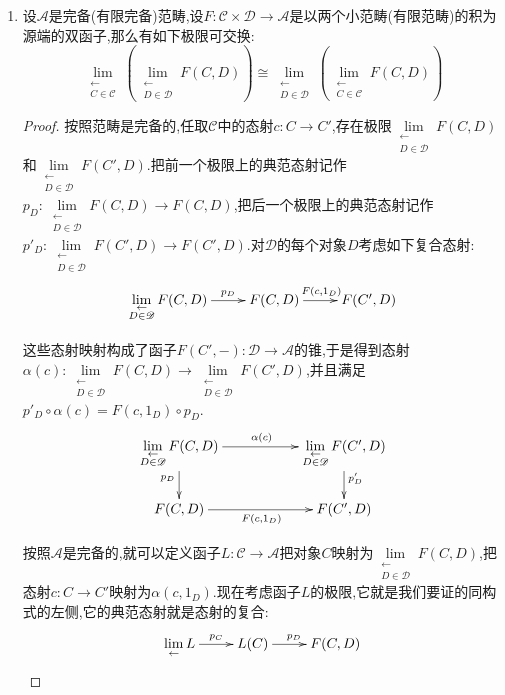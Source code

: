 \begin{enumerate}
	\item 设$\mathscr{A}$是完备(有限完备)范畴,设$F:\mathscr{C}\times\mathscr{D}\to\mathscr{A}$是以两个小范畴(有限范畴)的积为源端的双函子,那么有如下极限可交换:
	$$\lim\limits_{\substack{\leftarrow\\C\in\mathscr{C}}}\left(\lim\limits_{\substack{\leftarrow\\D\in\mathscr{D}}}F(C,D)\right)\cong\lim\limits_{\substack{\leftarrow\\D\in\mathscr{D}}}\left(\lim\limits_{\substack{\leftarrow\\C\in\mathscr{C}}}F(C,D)\right)$$
	\begin{proof}
		
		按照范畴是完备的,任取$\mathscr{C}$中的态射$c:C\to C'$,存在极限$\lim\limits_{\substack{\leftarrow\\D\in\mathscr{D}}}F(C,D)$和$\lim\limits_{\substack{\leftarrow\\D\in\mathscr{D}}}F(C',D)$.把前一个极限上的典范态射记作$p_D:\lim\limits_{\substack{\leftarrow\\D\in\mathscr{D}}}F(C,D)\to F(C,D)$,把后一个极限上的典范态射记作$p'_D:\lim\limits_{\substack{\leftarrow\\D\in\mathscr{D}}}F(C',D)\to F(C',D)$.对$\mathscr{D}$的每个对象$D$考虑如下复合态射:
		$$\xymatrix{\lim\limits_{\substack{\leftarrow\\D\in\mathscr{D}}}F(C,D)\ar[r]^{\quad p_D}&F(C,D)\ar[r]^{F(c,1_D)}&F(C',D)}$$
		
		这些态射映射构成了函子$F(C',-):\mathscr{D}\to\mathscr{A}$的锥,于是得到态射$\alpha(c):\lim\limits_{\substack{\leftarrow\\D\in\mathscr{D}}}F(C,D)\to\lim\limits_{\substack{\leftarrow\\D\in\mathscr{D}}}F(C',D)$,并且满足$p'_D\circ\alpha(c)=F(c,1_D)\circ p_D$.
		$$\xymatrix{\lim\limits_{\substack{\leftarrow\\D\in\mathscr{D}}}F(C,D)\ar[rr]^{\alpha(c)}\ar[d]_{p_D}&&\lim\limits_{\substack{\leftarrow\\D\in\mathscr{D}}}F(C',D)\ar[d]^{p'_D}\\F(C,D)\ar[rr]_{F(c,1_D)}&&F(C',D)}$$
		
		按照$\mathscr{A}$是完备的,就可以定义函子$L:\mathscr{C}\to\mathscr{A}$把对象$C$映射为$\lim\limits_{\substack{\leftarrow\\D\in\mathscr{D}}}F(C,D)$,把态射$c:C\to C'$映射为$\alpha(c,1_D)$.现在考虑函子$L$的极限,它就是我们要证的同构式的左侧,它的典范态射就是态射的复合:
		$$\xymatrix{\lim\limits_{\leftarrow}L\ar[r]^{p_C}&L(C)\ar[r]^{p_D}&F(C,D)}$$
		

\end{proof}
\end{enumerate}
